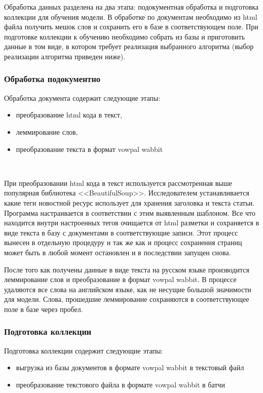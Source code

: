 Обработка данных разделена на два этапа: подокументная обработка и подготовка коллекции для обучения модели. В обработке по документам необходимо из html файла получить мешок слов и сохранить его в базе в соответствующем поле. При подготовке коллекции к обучению необходимо собрать из базы и приготовить данные в том виде, в котором требует реализация выбранного алгоритма (выбор реализации алгоритма приведен ниже).

\subsubsection{Обработка подокументно}

Обработка документа содержит следующие этапы:

\begin{itemize}
    \item преобразование html кода в текст,
    \item леммирование слов,
    \item преобразование текста в формат vowpal wabbit
\end{itemize}
~\

При преобразовании html кода в текст используется рассмотренная выше популярная библиотека <<BeautifulSoup>>. Исследователем устанавливается какие теги новостной ресурс использует для хранения заголовка и текста статьи. Программа настраивается в соответствии с этим выявленным шаблоном. Все что находится внутри настроенных тегов очищается от html разметки и сохраняется в виде текста в базу с документами в соответствующие записи. Этот процесс вынесен в отдельную процедуру и так же как и процесс сохранения страниц может быть в любой момент остановлен и в последствии запущен снова.

После того как получены данные в виде текста на русском языке производится леммирование слов и преобразование в формат vowpal wabbit. В процессе удаляются все слова на английском языке, как не несущие большой значимости для модели. Слова, прошедшие леммирование сохраняются в соответствующее поле в базе через пробел.

\subsubsection{Подготовка коллекции}

Подготовка коллекции содержит следующие этапы:

\begin{itemize}
    \item выгрузка из базы документов в формате vowpal wabbit в текстовый файл
    \item преобразование текстового файла в формате vowpal wabbit в батчи
\end{itemize}
~\

